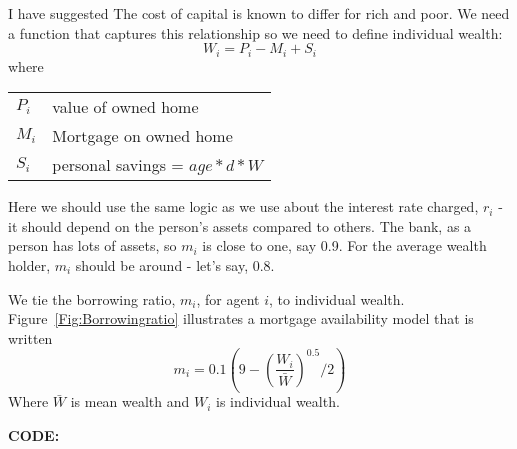 I have suggested The cost of capital is known to differ for rich and poor. We need a function that captures this relationship so we need to define individual wealth:
\[W_i= P_i -M_i  +S_i\]
where 

\begin{tabular}{ll}
$P_i$ & value of owned home\\
$M_i$ & Mortgage on owned home\\
$S_i$ & personal savings = $age*d*W$\\
\end{tabular}

Here we should use the same logic as we use about the interest rate charged, $r_i$ - it should depend on the person's assets compared to others. The bank, as a person has lots of assets, so $m_i$ is close to one, say 0.9. For the average wealth holder, $m_i$ should be around - let's say, 0.8. 

We  tie the borrowing ratio, $m_i$,  for agent $i$, to individual wealth. Figure~\ref{Fig:Borrowingratio} illustrates a mortgage availability  model that is written 
 \[ m_i = 0.1(9-\left(\frac{W_i}{\bar W}\right)^{0.5}/2 )\]
Where $\bar{W}$ is mean wealth and $W_i$ is individual wealth. 




\textbf{CODE:}  

